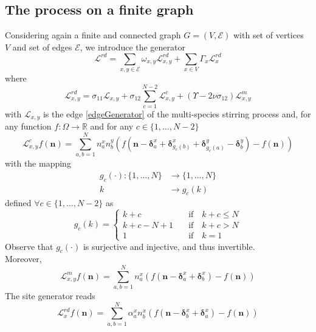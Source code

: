 \documentclass[10pt]{article}
\numberwithin{equation}{section}
\numberwithin{equation}{subsection}
\begin{document}
\subsection{The process on a finite graph}
Considering again a finite and connected graph $G=(V,\mathcal{E})$ with set of vertices $V$ and set of edges $\mathcal{E}$, we introduce the generator
\begin{equation}\label{RDGenerator}
	\mathcal{L}^{rd}=\sum_{x,y\in\mathcal{E}}\omega_{x,y}\mathcal{L}_{x,y}^{rd}+\sum_{x\in V}\Gamma_{x}\mathcal{L}_{x}^{rd}
\end{equation}
where
\begin{equation}\label{edgeGeneratorRD}
	\mathcal{L}_{x,y}^{rd}=\sigma_{11}\mathcal{L}_{x,y}+\sigma_{12}\sum_{c=1}^{N-2}\mathcal{L}_{x,y}^{c}+(\Upsilon-2\nu\sigma_{12})\mathcal{L}_{x,y}^{m}
\end{equation}
with $\mathcal{L}_{x,y}$ is the edge \eqref{edgeGenerator} of the multi-species stirring process and, for any function $f:\Omega\to \mathbb{R}$ and for any $c\in \{1,\ldots,N-2\}$
\begin{equation}
	\mathcal{L}_{x,y}^{c}f(\bm{n})=\sum_{a,b=1}^{N}n_{a}^{x}n_{b}^{y}\left(f(\bm{n}-\bm{\delta}_{a}^{x}+\bm{\delta}_{g_{c}(b)}^{x}+\bm{\delta}_{g_{c}(a)}^{y}-\bm{\delta}_{b}^{y})-f(\bm{n})\right)
\end{equation}
with the mapping 
\begin{equation}
	\begin{split}
		g_{c}(\cdot):\{1,\ldots,N\}&\to\{1,\ldots,N\}\\
		k&\to g_{c}(k)
	\end{split}
\end{equation}
defined $\forall c\in\{1,\ldots,N-2\}$ as 
\begin{equation}
	g_{c}(k)=\begin{cases}
		k+c \quad &\text{if}\quad k+c\leq N\\
		k+c-N+1\quad &\text{if}\quad k+c>N\\
		1\quad &\text{if}\quad k=1
	\end{cases}
\end{equation}
Observe that $g_{c}(\cdot)$ is surjective and injective, and thus invertible. \\
Moreover,
\begin{equation}
	\mathcal{L}_{x,y}^{m}f(\bm{n})=\sum_{a,b=1}^{N}n_{a}^{x}\left(f(\bm{n}-\bm{\delta}_{a}^{x}+\bm{\delta}_{b}^{x})-f(\bm{n})\right)
\end{equation}
The site generator reads
\begin{equation}
	\mathcal{L}_{x}^{rd}f(\bm{n})=\sum_{a,b=1}^{N}\alpha_{a}^{x}n_{b}^{x}\left(f(\bm{n}-\bm{\delta}_{b}^{x}+\bm{\delta}_{a}^{x})-f(\bm{n})\right)
\end{equation}
\end{document}
